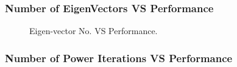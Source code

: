 \subsubsection{Number of EigenVectors VS Performance}

\begin{figure}[!htb]
\begin{floatrow}
{%
  \caption{Eigen-vector No. VS Performance.}%
}
\end{floatrow}
\end{figure}

\subsubsection{Number of Power Iterations VS Performance}

